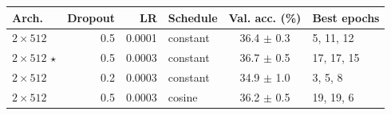\begin{tabular}{@{}l r r l c l@{}}
\toprule
Arch. & Dropout & LR & Schedule & Val. acc. (\%) & Best epochs \\
\midrule
$2\times512$ & 0.5 & 0.0001 & constant & 36.4 $\pm$ 0.3 & 5, 11, 12 \\
$2\times512$ $\star$ & 0.5 & 0.0003 & constant & 36.7 $\pm$ 0.5 & 17, 17, 15 \\
$2\times512$ & 0.2 & 0.0003 & constant & 34.9 $\pm$ 1.0 & 3, 5, 8 \\
$2\times512$ & 0.5 & 0.0003 & cosine & 36.2 $\pm$ 0.5 & 19, 19, 6 \\
\bottomrule
\end{tabular}
